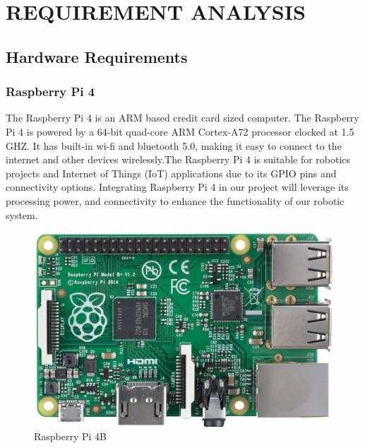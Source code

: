 \chapter{REQUIREMENT ANALYSIS}
\section{Hardware Requirements}
  \subsection{Raspberry Pi 4}
  The Raspberry Pi 4 is an ARM based credit card sized computer. The Raspberry Pi 4 is powered by a 64-bit quad-core ARM Cortex-A72 processor clocked at 1.5 GHZ. It has built-in wi-fi and bluetooth 5.0, making it easy to connect to the internet and other devices wirelessly.The Raspberry Pi 4 is suitable for robotics projects and Internet of Things (IoT) applications due to its GPIO pins and connectivity options. Integrating Raspberry Pi 4 in our project will leverage its processing power, and connectivity to enhance the functionality of our robotic system.
    \begin{figure}[h]
        \centering
        \includegraphics[width=1\linewidth]{Graphics/raspi24.png}
        \caption{Raspberry Pi 4B}
        \label{fig:enter-label}
    \end{figure}
  
